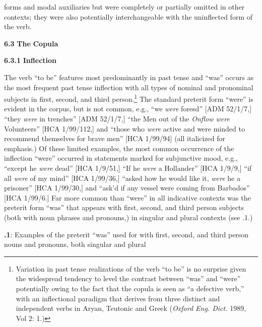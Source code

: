 forms and modal auxiliaries but were completely or partially omitted in other contexts; they were also potentially interchangeable with the uninflected form of the verb.

\textbf{6.3} \textbf{The} \textbf{Copula}

  \textbf{6.3.1} \textbf{Inflection}

  The verb “to be” features most predominantly in past tense and “was” occurs as the most frequent past tense inflection with all types of nominal and pronominal subjects in first, second, and third person.\footnote{Variation in past tense realizations of the verb “to be” is no surprise given the widespread tendency to level the contrast between “was” and “were” potentially owing to the fact that the copula is seen as “a defective verb,” with an inflectional paradigm that derives from three distinct and independent verbs in Aryan, Teutonic and Greek (\textit{Oxford Eng. Dict.} 1989, Vol 2: 1.)}  The standard preterit form “were” is evident in the corpus, but is not common, e.g., “we \textit{were} foresd” [ADM 52/1/7,] “they \textit{were} in trenches” [ADM 52/1/7,] “the Men out of the \textit{Onflow were} Volunteers” [HCA 1/99/112,] and “those who \textit{were} active and were minded to recommend themselves for brave men” [HCA 1/99/94] (all italicized for emphasis.) Of these limited examples, the most common occurrence of the inflection “were” occurred in statements marked for subjunctive mood, e.g., “except he \textit{were} dead” [HCA 1/9/51,] “If he \textit{were} a Hollander” [HCA 1/9/9,] “if all \textit{were} of my mind” [HCA 1/99/36,] “asked how he would like it, \textit{were} he a prisoner” [HCA 1/99/30,] and “ask’d if any vessel were coming from Barbados” [HCA 1/99/6.] Far more common than “were” in all indicative contexts was the preterit form “was” that appears with first, second, and third person subjects (both with noun phrases and pronouns,) in singular and plural contexts (see .1.) 

\textbf{.1}: Examples of the preterit “was” used for with first, second, and third person nouns and pronouns, both singular and plural

\tablefirsthead{}


